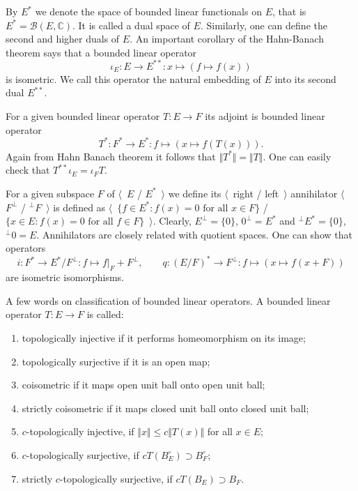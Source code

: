 By $E^*$ we denote the space of bounded linear functionals on $E$, that is
$E^*=\mathcal{B}(E, \mathbb{C})$. It is called a dual space of $E$. Similarly,
one can define the second and higher duals of $E$. An important corollary of the
Hahn-Banach theorem says that a bounded linear operator 
$$
\iota_E:E\to E^{**}:x\mapsto (f\mapsto f(x))
$$ 
is isometric. We call this operator the natural embedding of $E$ into its 
second dual $E^{**}$.

For a given bounded linear operator $T:E\to F$ its adjoint is bounded linear 
operator 
$$
T^*:F^*\to E^*:f\mapsto (x\mapsto f(T(x))).
$$
Again from Hahn Banach 
theorem it follows that $\Vert T^*\Vert=\Vert T\Vert$. One can easily check 
that $T^{**}\iota_E=\iota_F T$.  

For a given subspace $F$ of $\langle$~$E$ / $E^*$~$\rangle$ we define 
its $\langle$~right / left~$\rangle$ annihilator 
$\langle$~$F^\perp$ / ${}^\perp F$~$\rangle$ is defined as 
$\langle$~$ \{ f\in E^*: f(x)=0 \mbox{ for all } x\in F \}$ / 
$ \{ x\in E : f(x)=0 \mbox{ for all } f\in F \}$~$\rangle$. 
Clearly, $E^{\perp} = \{ 0\}$, $0^{\perp}=E^*$ 
and ${}^{\perp}E^*= \{ 0\}$, ${}^{\perp}0= E$. Annihilators are closely related
with quotient spaces. One can show that 
operators 
$$
i: F^*\to E^*/F^{\perp}: f\mapsto f|_F+F^\perp,
\quad\quad 
q:{(E/F)}^*\to F^{\perp}: f\mapsto (x\mapsto f(x + F))
$$ 
are isometric isomorphisms.

A few words on classification of bounded linear operators. A bounded linear
operator $T:E\to F$ is called:
\begin{enumerate}[label = (\roman*)]
  \item topologically injective if it performs homeomorphism on its image;

  \item topologically surjective if it is an open map;

  \item coisometric if it maps open unit ball onto open unit ball;

  \item strictly coisometric if it maps closed unit ball onto closed unit ball; 

  \item $c$-topologically injective, if $\Vert x\Vert\leq c\Vert  T(x)\Vert$ for
  all $x\in E$;

  \item $c$-topologically surjective, if $cT(B_E^\circ)\supset B_F^\circ$;

  \item strictly $c$-topologically surjective, if $cT(B_E)\supset B_F$.
\end{enumerate}

